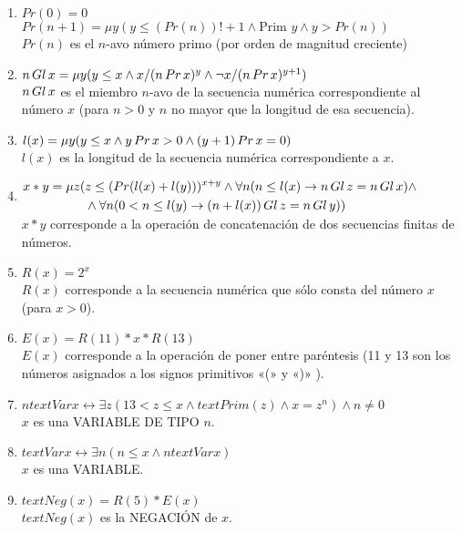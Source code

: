\begin{enumerate}
    \item $Pr(0) = 0$ \\ $Pr(n+1) = \mu y (y \leq (Pr(n))! + 1 \wedge \text{Prim } y \wedge y > Pr(n))$ \\ $Pr(n)$ es el $n$-avo número primo (por orden de 
            magnitud creciente)
    \item $n \thinspace Gl \thinspace x = \mu y (y \leq x \wedge x/(n \thinspace Pr \thinspace x)^y \wedge \lnot x/(n \thinspace Pr \thinspace x)^{y+1})$ \\ 
            $n \thinspace Gl \thinspace x$ es el miembro $n$-avo de la secuencia numérica correspondiente al número $x$ (para $n>0$ y $n$ no mayor que la 
            longitud de esa secuencia).
    \item $l(x) = \mu y (y \leq x \wedge y \thinspace Pr \thinspace x > 0 \wedge (y+1) \thinspace Pr \thinspace x = 0)$ \\ $l(x)$ es la longitud de la secuencia 
            numérica correspondiente a $x$.
    \item   $\begin{aligned}
                x * y = \mu z (&z \leq (Pr(l(x) + l(y)))^{x+y} \wedge \forall n (n \leq l(x) \rightarrow n \thinspace Gl \thinspace z = n \thinspace Gl \thinspace x) \wedge \\ 
                &\wedge \forall n (0 < n \leq l(y) \rightarrow (n + l(x)) \thinspace Gl \thinspace z = n \thinspace Gl \thinspace y))
            \end{aligned}$ \\
            $x*y$ corresponde a la operación de concatenación de dos secuencias finitas de números.
    \item $R(x) = 2^x$ \\ $R(x)$ corresponde a la secuencia numérica que sólo consta del número $x$ (para $x>0$).
    \item $E(x) = R(11) * x * R(13)$ \\ $E(x)$ corresponde a la operación de poner entre paréntesis (11 y 13 son los números asignados a los 
            signos primitivos «(» y «)» ).
    \item $n text{ Var } x \leftrightarrow \exists z (13 < z \leq x \wedge text{Prim}(z) \wedge x = z^n) \wedge n \neq 0$ \\ $x$ es una VARIABLE DE TIPO $n$.
    \item $text{ Var } x \leftrightarrow \exists n (n \leq x \wedge n text{ Var } x )$ \\ $x$ es una VARIABLE.
    \item $text{Neg}(x) = R(5) * E(x)$ \\ $text{Neg}(x)$ es la NEGACIÓN de $x$.

\end{enumerate}
